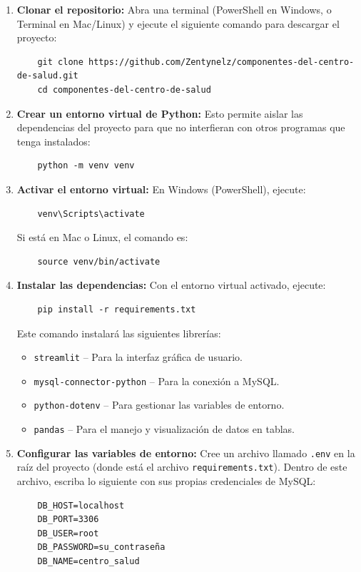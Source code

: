 \documentclass[12pt,a4paper]{article}
\begin{document}
\begin{enumerate}

    \item \textbf{Clonar el repositorio:} Abra una terminal (PowerShell en Windows, o Terminal en Mac/Linux) y ejecute el siguiente comando para descargar el proyecto:
    {\small\begin{verbatim}
    git clone https://github.com/Zentynelz/componentes-del-centro-de-salud.git
    cd componentes-del-centro-de-salud
    \end{verbatim}}

    \item \textbf{Crear un entorno virtual de Python:} Esto permite aislar las dependencias del proyecto para que no interfieran con otros programas que tenga instalados:
    {\small\begin{verbatim}
    python -m venv venv
    \end{verbatim}}

    \item \textbf{Activar el entorno virtual:} En Windows (PowerShell), ejecute:
    {\small\begin{verbatim}
    venv\Scripts\activate
    \end{verbatim}}
    Si est\'a en Mac o Linux, el comando es:
    {\small\begin{verbatim}
    source venv/bin/activate
    \end{verbatim}}

    \item \textbf{Instalar las dependencias:} Con el entorno virtual activado, ejecute:
    {\small\begin{verbatim}
    pip install -r requirements.txt
    \end{verbatim}}
    Este comando instalar\'a las siguientes librer\'ias:
    \begin{itemize}
        \item \texttt{streamlit} -- Para la interfaz gr\'afica de usuario.
        \item \texttt{mysql-connector-python} -- Para la conexi\'on a MySQL.
        \item \texttt{python-dotenv} -- Para gestionar las variables de entorno.
        \item \texttt{pandas} -- Para el manejo y visualizaci\'on de datos en tablas.
    \end{itemize}

    \item \textbf{Configurar las variables de entorno:} Cree un archivo llamado \texttt{.env} en la ra\'iz del proyecto (donde est\'a el archivo \texttt{requirements.txt}). Dentro de este archivo, escriba lo siguiente con sus propias credenciales de MySQL:
    {\small\begin{verbatim}
    DB_HOST=localhost
    DB_PORT=3306
    DB_USER=root
    DB_PASSWORD=su_contraseña
    DB_NAME=centro_salud
    \end{verbatim}}


\end{enumerate}
\end{document}
